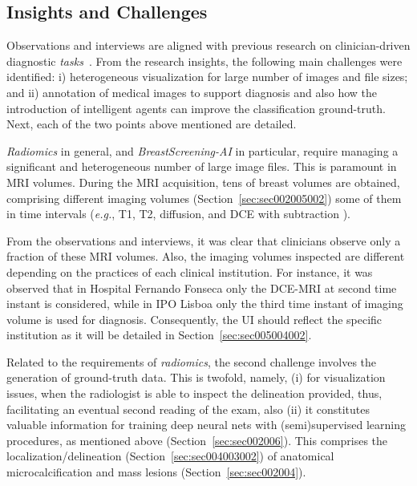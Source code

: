 \subsection{Insights and Challenges}
\label{sec:sec005003001}

Observations and interviews are aligned with previous research on clinician-driven diagnostic {\it tasks}~\cite{rosset2004osirix, wolf2005medical, Sultanum:2018:MTP:3173574.3173996, weese2016four, heinrich2012mind}.
From the research insights, the following main challenges were identified:
i) heterogeneous visualization for large number of images and file sizes; and
ii) annotation of medical images to support diagnosis and also how the introduction of intelligent agents can improve the classification ground-truth.
Next, each of the two points above mentioned are detailed.

{\it Radiomics} in general, and {\it BreastScreening-AI} in particular, require managing a significant and heterogeneous number of large image files.
This is paramount in \ac{MRI} volumes.
During the \ac{MRI} acquisition, tens of breast volumes are obtained, comprising different imaging volumes (Section~\ref{sec:sec002005002}) some of them in time intervals ({\it e.g.}, T1, T2, diffusion, and \ac{DCE} with subtraction \cite{sorace2018distinguishing}).

From the  observations and interviews, it was clear that clinicians observe only a fraction of these \ac{MRI} volumes.
Also, the imaging volumes inspected are different depending on the practices of each clinical institution.
For instance, it was observed that in Hospital Fernando Fonseca only the \ac{DCE}-\ac{MRI} at second time instant is considered, while in IPO Lisboa only the third time instant of imaging volume is used for diagnosis.
Consequently, the \ac{UI} should reflect the specific institution as it will be detailed in Section~\ref{sec:sec005004002}.

Related to the requirements of {\it radiomics}, the second challenge involves the generation of ground-truth data. This is twofold, namely, (i) for visualization issues, when the radiologist is able to inspect the delineation provided, thus, facilitating an eventual second reading of the exam, also (ii) it constitutes valuable information for training deep neural nets with (semi)supervised learning procedures, as mentioned above (Section~\ref{sec:sec002006}).
This comprises the localization/delineation (Section~\ref{sec:sec004003002}) of anatomical microcalcification and mass lesions (Section~\ref{sec:sec002004}).

